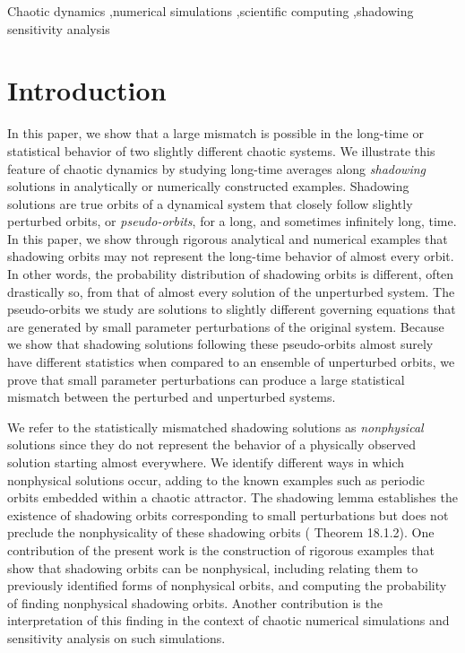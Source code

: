\documentclass[preprint,12pt]{elsarticle}
\begin{document}
\begin{frontmatter}
\begin{keyword}
Chaotic dynamics \sep numerical simulations \sep scientific computing 
\sep shadowing sensitivity analysis %



\end{keyword}

\end{frontmatter}


\section{Introduction}
In this paper, we show that a large mismatch is possible in the long-time or statistical behavior of two slightly different chaotic systems. We illustrate this feature of chaotic dynamics by studying long-time averages along {\em shadowing} solutions in analytically or numerically constructed examples. Shadowing solutions are true orbits of a dynamical system that closely follow slightly perturbed orbits, or {\em pseudo-orbits},  for a long, and sometimes infinitely long, time. In this paper, we show through rigorous analytical and numerical examples that shadowing orbits may not represent the long-time behavior of almost every orbit. In other words, the probability distribution of shadowing orbits is different, often drastically so, from that of almost every solution of the unperturbed system. The pseudo-orbits we study are solutions to slightly different governing equations that are generated by small parameter perturbations of the original system. Because we show that shadowing solutions following these pseudo-orbits almost surely have different statistics when compared to an ensemble of unperturbed orbits, we prove that small parameter perturbations can produce a large statistical mismatch between the perturbed and unperturbed systems.  

We refer to the statistically mismatched shadowing solutions as {\em nonphysical} solutions since they do not represent the behavior of a physically observed solution starting almost everywhere. We identify different ways in which nonphysical solutions occur, adding to the known examples such as periodic orbits embedded within a chaotic attractor. The shadowing lemma \cite{anosov}\cite{bowen} establishes the existence of shadowing orbits corresponding to small perturbations but does not preclude the nonphysicality of these shadowing orbits (\cite{katok} Theorem 18.1.2). One contribution of the present work is the construction of rigorous examples that show that shadowing orbits can be nonphysical, including relating them to previously identified forms of nonphysical orbits, and computing the probability of finding nonphysical shadowing orbits. Another contribution is the interpretation of this finding in the context of chaotic numerical simulations and sensitivity analysis on such simulations.
\end{document}
